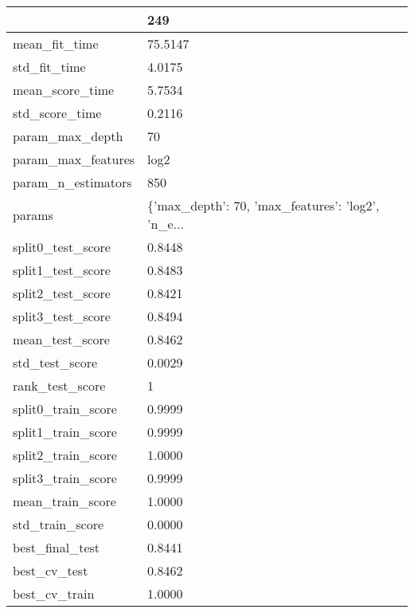 \begin{tabular}{ll}
\toprule
{} &                                                249 \\
\midrule
mean\_fit\_time      &                                            75.5147 \\
std\_fit\_time       &                                             4.0175 \\
mean\_score\_time    &                                             5.7534 \\
std\_score\_time     &                                             0.2116 \\
param\_max\_depth    &                                                 70 \\
param\_max\_features &                                               log2 \\
param\_n\_estimators &                                                850 \\
params             &  \{'max\_depth': 70, 'max\_features': 'log2', 'n\_e... \\
split0\_test\_score  &                                             0.8448 \\
split1\_test\_score  &                                             0.8483 \\
split2\_test\_score  &                                             0.8421 \\
split3\_test\_score  &                                             0.8494 \\
mean\_test\_score    &                                             0.8462 \\
std\_test\_score     &                                             0.0029 \\
rank\_test\_score    &                                                  1 \\
split0\_train\_score &                                             0.9999 \\
split1\_train\_score &                                             0.9999 \\
split2\_train\_score &                                             1.0000 \\
split3\_train\_score &                                             0.9999 \\
mean\_train\_score   &                                             1.0000 \\
std\_train\_score    &                                             0.0000 \\
best\_final\_test    &                                             0.8441 \\
best\_cv\_test       &                                             0.8462 \\
best\_cv\_train      &                                             1.0000 \\
\bottomrule
\end{tabular}
